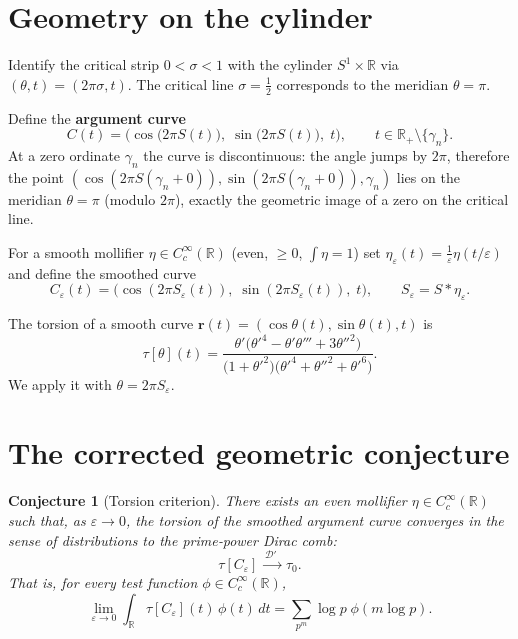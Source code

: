 \documentclass[12pt,a4paper]{article}
\newtheorem{conjecture}[theorem]{Conjecture}
\newcommand{\R}{\mathbb{R}}
\newcommand{\D}{\mathcal{D}'}
\begin{document}
\section{Geometry on the cylinder}

Identify the critical strip \(0<\sigma<1\) with the cylinder \(S^1\times\R\) via
\((\theta,t) = (2\pi\sigma, t)\).  The critical line \(\sigma=\tfrac12\) corresponds to the
meridian \(\theta = \pi\).

Define the \textbf{argument curve}
\[
C(t) = \bigl( \cos\bigl(2\pi S(t)\bigr),\; \sin\bigl(2\pi S(t)\bigr),\; t \bigr),
\qquad t\in\R_+\setminus\{\gamma_n\}.
\]
At a zero ordinate \(\gamma_n\) the curve is discontinuous: the angle jumps by \(2\pi\),
therefore the point \(( \cos(2\pi S(\gamma_n+0)), \sin(2\pi S(\gamma_n+0)), \gamma_n )\) lies
on the meridian \(\theta=\pi\) (modulo \(2\pi\)), exactly the geometric image of a zero on the
critical line.

For a smooth mollifier \(\eta\in C_c^\infty(\R)\) (even, \(\ge0\), \(\int\eta=1\)) set
\(\eta_\varepsilon(t)=\frac1\varepsilon\eta(t/\varepsilon)\) and define the smoothed curve
\[
C_\varepsilon(t) = \bigl( \cos(2\pi S_\varepsilon(t)),\;
                         \sin(2\pi S_\varepsilon(t)),\; t \bigr),\qquad
S_\varepsilon = S * \eta_\varepsilon .
\]

The torsion of a smooth curve \(\mathbf{r}(t)=(\cos\theta(t),\sin\theta(t),t)\) is
\begin{equation}\label{eq:torsion}
\tau[\theta](t) =
\frac{\theta'\bigl(\theta'^4 - \theta'\theta''' + 3\theta''^2\bigr)}
{\bigl(1+\theta'^2\bigr)\bigl(\theta'^4 + \theta''^2 + \theta'^6\bigr)} .
\end{equation}
We apply it with \(\theta = 2\pi S_\varepsilon\).

\section{The corrected geometric conjecture}

\begin{conjecture}[Torsion criterion]\label{conj:torsion}
There exists an even mollifier \(\eta\in C_c^\infty(\R)\) such that, as \(\varepsilon\to0\),
the torsion of the smoothed argument curve converges in the sense of distributions to the
prime‑power Dirac comb:
\[
\tau[C_\varepsilon] \xrightarrow{\;\D\;\;} \tau_0 .
\]
That is, for every test function \(\phi\in C_c^\infty(\R)\),
\[
\lim_{\varepsilon\to0} \int_{\R} \tau[C_\varepsilon](t)\,\phi(t)\,dt
= \sum_{p^m} \log p\; \phi(m\log p).
\]
\end{conjecture}
\end{document}
